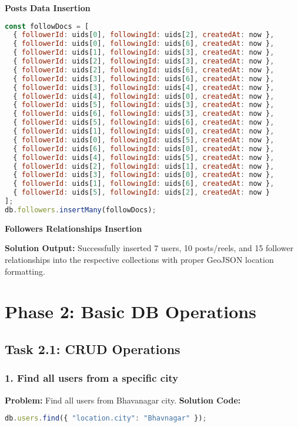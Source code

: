 \documentclass[12pt,a4paper]{article}
\begin{document}
\begin{center}
\textbf{Posts Data Insertion}
\end{center}

\begin{lstlisting}[language=JavaScript]
const followDocs = [
  { followerId: uids[0], followingId: uids[2], createdAt: now },
  { followerId: uids[0], followingId: uids[6], createdAt: now },
  { followerId: uids[1], followingId: uids[3], createdAt: now },
  { followerId: uids[2], followingId: uids[3], createdAt: now },
  { followerId: uids[2], followingId: uids[6], createdAt: now },
  { followerId: uids[3], followingId: uids[6], createdAt: now },
  { followerId: uids[3], followingId: uids[4], createdAt: now },
  { followerId: uids[4], followingId: uids[0], createdAt: now },
  { followerId: uids[5], followingId: uids[3], createdAt: now },
  { followerId: uids[6], followingId: uids[3], createdAt: now },
  { followerId: uids[5], followingId: uids[6], createdAt: now },
  { followerId: uids[1], followingId: uids[0], createdAt: now },
  { followerId: uids[0], followingId: uids[5], createdAt: now },
  { followerId: uids[6], followingId: uids[0], createdAt: now },
  { followerId: uids[4], followingId: uids[5], createdAt: now },
  { followerId: uids[2], followingId: uids[1], createdAt: now },
  { followerId: uids[3], followingId: uids[0], createdAt: now },
  { followerId: uids[1], followingId: uids[6], createdAt: now },
  { followerId: uids[5], followingId: uids[2], createdAt: now }
];
db.followers.insertMany(followDocs);
\end{lstlisting}

\begin{center}
\textbf{Followers Relationships Insertion}
\end{center}
\textbf{Solution Output:} Successfully inserted 7 users, 10 posts/reels, and 15 follower relationships into the respective collections with proper GeoJSON location formatting.

\section{Phase 2: Basic DB Operations}
\subsection{Task 2.1: CRUD Operations}
\subsubsection{1. Find all users from a specific city}
\textbf{Problem:} Find all users from Bhavanagar city.
\textbf{Solution Code:}
\begin{lstlisting}[language=JavaScript]
db.users.find({ "location.city": "Bhavnagar" });
\end{lstlisting}
\end{document}
